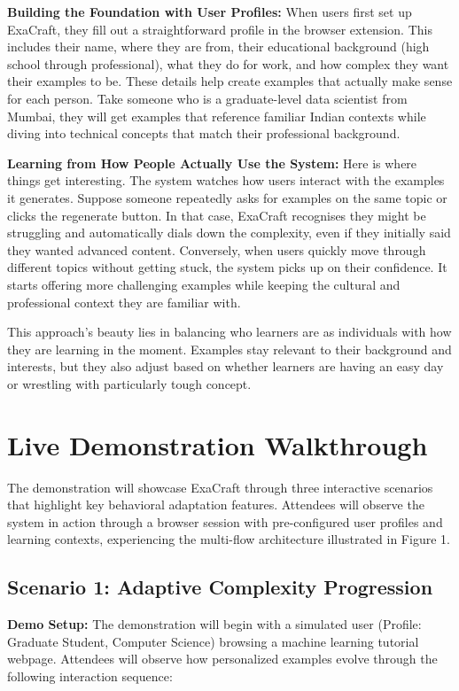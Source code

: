 \documentclass[sigconf]{acmart}
\begin{document}
\textbf{Building the Foundation with User Profiles:} When users first set up ExaCraft, they fill out a straightforward profile in the browser extension. This includes their name, where they are from, their educational background (high school through professional), what they do for work, and how complex they want their examples to be. These details help create examples that actually make sense for each person. Take someone who is a graduate-level data scientist from Mumbai, they will get examples that reference familiar Indian contexts while diving into technical concepts that match their professional background.

\textbf{Learning from How People Actually Use the System:} Here is where things get interesting. The system watches how users interact with the examples it generates. Suppose someone repeatedly asks for examples on the same topic or clicks the regenerate button. In that case, ExaCraft recognises they might be struggling and automatically dials down the complexity, even if they initially said they wanted advanced content. Conversely, when users quickly move through different topics without getting stuck, the system picks up on their confidence. It starts offering more challenging examples while keeping the cultural and professional context they are familiar with.

This approach's beauty lies in balancing who learners are as individuals with how they are learning in the moment. Examples stay relevant to their background and interests, but they also adjust based on whether learners are having an easy day or wrestling with particularly tough concept.


\section{Live Demonstration Walkthrough}

The demonstration will showcase ExaCraft through three interactive scenarios that highlight key behavioral adaptation features. Attendees will observe the system in action through a browser session with pre-configured user profiles and learning contexts, experiencing the multi-flow architecture illustrated in Figure 1.

\subsection{Scenario 1: Adaptive Complexity Progression}

\textbf{Demo Setup:} The demonstration will begin with a simulated user (Profile: Graduate Student, Computer Science) browsing a machine learning tutorial webpage. Attendees will observe how personalized examples evolve through the following interaction sequence:
\end{document}
